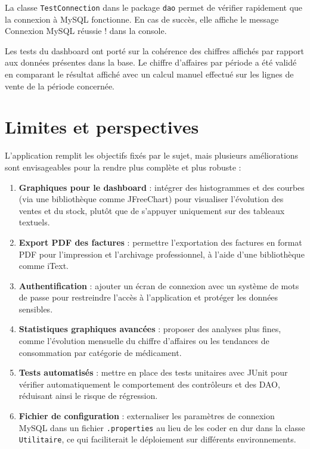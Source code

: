 \documentclass[12pt,a4paper]{report}
\begin{document}
La classe \texttt{TestConnection} dans le package \texttt{dao} permet de vérifier rapidement que la connexion à MySQL fonctionne. En cas de succès, elle affiche le message \og Connexion MySQL réussie ! \fg{} dans la console.

Les tests du dashboard ont porté sur la cohérence des chiffres affichés par rapport aux données présentes dans la base. Le chiffre d'affaires par période a été validé en comparant le résultat affiché avec un calcul manuel effectué sur les lignes de vente de la période concernée.

\chapter{Limites et perspectives}

L'application remplit les objectifs fixés par le sujet, mais plusieurs améliorations sont envisageables pour la rendre plus complète et plus robuste :

\begin{enumerate}[nosep]
  \item \textbf{Graphiques pour le dashboard} : intégrer des histogrammes et des courbes (via une bibliothèque comme JFreeChart) pour visualiser l'évolution des ventes et du stock, plutôt que de s'appuyer uniquement sur des tableaux textuels.

  \item \textbf{Export PDF des factures} : permettre l'exportation des factures en format PDF pour l'impression et l'archivage professionnel, à l'aide d'une bibliothèque comme iText.

  \item \textbf{Authentification} : ajouter un écran de connexion avec un système de mots de passe pour restreindre l'accès à l'application et protéger les données sensibles.

  \item \textbf{Statistiques graphiques avancées} : proposer des analyses plus fines, comme l'évolution mensuelle du chiffre d'affaires ou les tendances de consommation par catégorie de médicament.

  \item \textbf{Tests automatisés} : mettre en place des tests unitaires avec JUnit pour vérifier automatiquement le comportement des contrôleurs et des DAO, réduisant ainsi le risque de régression.

  \item \textbf{Fichier de configuration} : externaliser les paramètres de connexion MySQL dans un fichier \texttt{.properties} au lieu de les coder en dur dans la classe \texttt{Utilitaire}, ce qui faciliterait le déploiement sur différents environnements.
\end{enumerate}
\end{document}
